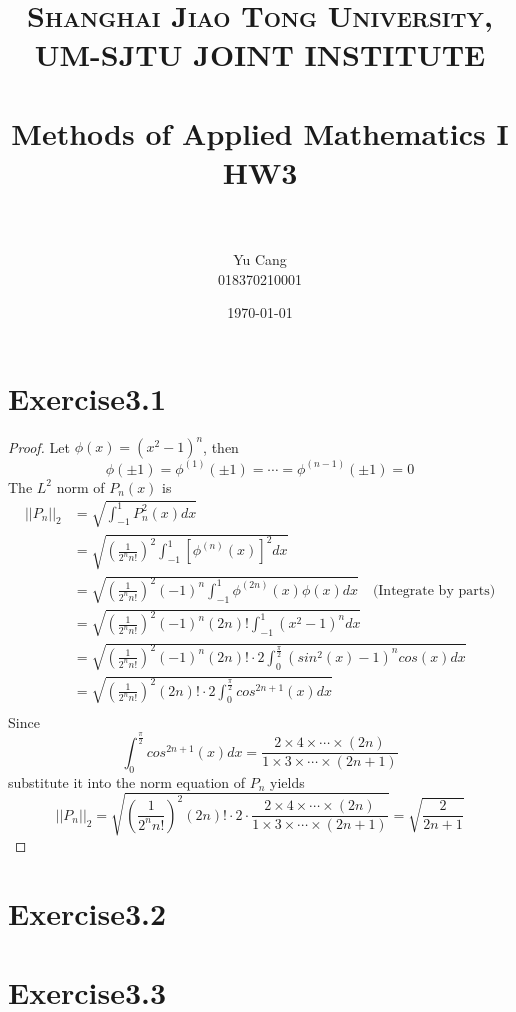 \documentclass[paper=a4, fontsize=11pt]{scrartcl} %
\title{	
\normalfont \normalsize 
\textsc{Shanghai Jiao Tong University, UM-SJTU JOINT INSTITUTE} \\ [25pt] %
\horrule{0.5pt} \\[0.4cm] %
\huge Methods of Applied Mathematics I\\ HW3 \\ %
\horrule{2pt} \\[0.5cm] %
}
\author{Yu Cang \\ 018370210001} %
\date{\normalsize \today} %
\numberwithin{equation}{section} %
\numberwithin{figure}{section} %
\numberwithin{table}{section} %
\begin{document}
\maketitle %

\section{Exercise3.1}
	\begin{proof}
		Let $\phi(x) = (x^2 - 1)^n$, then
		\begin{equation}
			\phi(\pm 1) = \phi^{(1)}(\pm 1) = \cdots = \phi^{(n-1)}(\pm 1) = 0
		\end{equation}
		The $L^2$ norm of $P_n(x)$ is
		\begin{equation}
			\begin{aligned}
				||P_n||_2  & = \sqrt{\int_{-1}^{1} P_n^2(x) dx}\\
						   & = \sqrt{(\frac{1}{2^n n!})^2 \int_{-1}^{1} [\phi^{(n)}(x)]^2 dx}\\
						   & = \sqrt{(\frac{1}{2^n n!})^2 (-1)^n \int_{-1}^{1} \phi^{(2n)}(x) \phi(x) dx} \quad \text{(Integrate by parts)}\\
						   & = \sqrt{(\frac{1}{2^n n!})^2 (-1)^n (2n)! \int_{-1}^{1} (x^2 - 1)^n dx}\\
						   & = \sqrt{(\frac{1}{2^n n!})^2 (-1)^n (2n)! \cdot 2 \int_{0}^{\frac{\pi}{2}} (sin^2(x) - 1)^n cos(x) dx}\\
						   & = \sqrt{(\frac{1}{2^n n!})^2 (2n)! \cdot 2 \int_{0}^{\frac{\pi}{2}} cos^{2n+1}(x) dx}\\
			\end{aligned}
		\end{equation}
		Since
		\begin{equation}
			\int_{0}^{\frac{\pi}{2}} cos^{2n+1}(x) dx = \frac{2 \times 4 \times \cdots \times (2n)}{1\times3\times \cdots \times (2n+1)} 
		\end{equation}
		substitute it into the norm equation of $P_n$ yields
		\begin{equation}
			||P_n||_2 = \sqrt{(\frac{1}{2^n n!})^2 (2n)! \cdot 2 \cdot \frac{2 \times 4 \times \cdots \times (2n)}{1\times3\times \cdots \times(2n+1)}} = \sqrt{\frac{2}{2n+1}}
		\end{equation}
	\end{proof}

\section{Exercise3.2}

\section{Exercise3.3}
\end{document}
